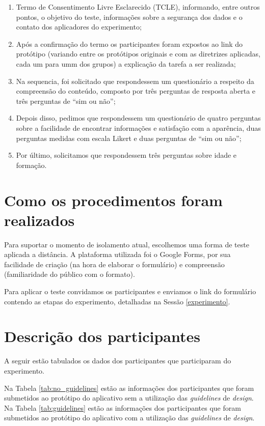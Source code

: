 \documentclass[12pt]{article}
\begin{document}
\begin{enumerate}
\item Termo de Consentimento Livre Esclarecido (TCLE), informando, entre outros pontos, o objetivo do teste, informações sobre a segurança dos dados e o contato dos aplicadores do experimento;
\item Após a confirmação do termo os participantes foram expostos ao link do protótipo (variando entre os protótipos originais e com as diretrizes aplicadas, cada um para umm dos grupos) a explicação da tarefa a ser realizada;
\item Na sequencia, foi solicitado que respondessem um questionário a respeito da compreensão do conteúdo, composto por três perguntas de resposta aberta e três perguntas de ``sim ou não'';
\item Depois disso, pedimos que respondessem um questionário de quatro perguntas sobre a facilidade de encontrar informações e satisfação com a aparência, duas perguntas medidas com escala Likert e duas perguntas de ``sim ou não'';
\item Por último, solicitamos que respondessem três perguntas sobre idade e formação.
\end{enumerate}

\section{Como os procedimentos foram realizados}

Para suportar o momento de isolamento atual, escolhemos uma forma de teste aplicada a distância. A plataforma utilizada foi o Google Forms, por sua facilidade de criação (na hora de elaborar o formulário) e compreensão (familiaridade do público com o formato).

Para aplicar o teste convidamos os participantes e enviamos o link do formulário contendo as etapas do experimento, detalhadas na Sessão \ref{experimento}.

\section{Descrição dos participantes}

A seguir estão tabulados os dados dos participantes que participaram do experimento.

Na Tabela \ref{tab:no_guidelines} estão as informações dos participantes que foram submetidos ao protótipo do aplicativo sem a utilização das \textit{guidelines} de \textit{design}. Na Tabela \ref{tab:guidelines} estão as informações dos participantes que foram submetidos ao protótipo do aplicativo com a utilização das \textit{guidelines} de \textit{design}.
\end{document}
